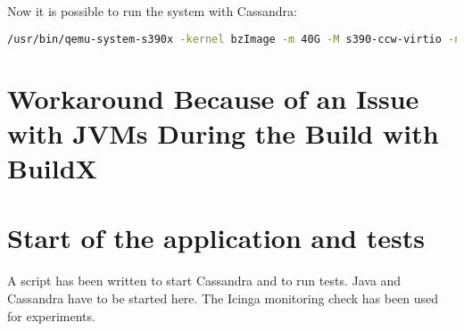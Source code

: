Now it is possible to run the system with Cassandra: \\
\begin{lstlisting}[language=bash,caption={Run Cassandra},captionpos=b,label={RunCassandra}]
 /usr/bin/qemu-system-s390x -kernel bzImage -m 40G -M s390-ccw-virtio -nodefaults -device sclpconsole,chardev=console -parallel none -net none -chardev stdio,id=console,signal=off,mux=on -mon chardev=console -nographic -smp 3 -hda /data/dockerfile-examples/ApacheCassandra/cassandra.img --append 'root=/dev/vda rw console=ttyS0 rdinit=/bin/bash' 
 \end{lstlisting}
 
\section{Workaround Because of an Issue with JVMs During the Build with BuildX}

\section{Start of the application and tests}

A script has been written to start Cassandra and to run tests. Java and Cassandra have to be started here. The Icinga monitoring check has been used for experiments.
